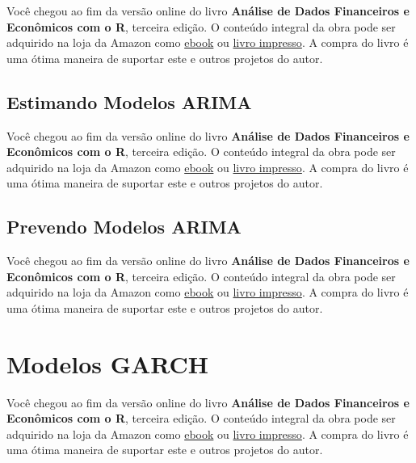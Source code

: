 \documentclass[
  11pt,
]{book}
\newenvironment{pleasebuyit}
{\begin{noteblock}
		
	} {\end{noteblock}}
\begin{document}
\begin{pleasebuyit}
Você chegou ao fim da versão online do livro \textbf{Análise de Dados
Financeiros e Econômicos com o R}, terceira edição. O conteúdo integral
da obra pode ser adquirido na loja da Amazon como
\href{https://www.amazon.com.br/dp/B08WNC27ZY}{ebook} ou
\href{https://www.amazon.com/dp/B08WP8CCDB}{livro impresso}. A compra do
livro é uma ótima maneira de suportar este e outros projetos do autor.
\end{pleasebuyit}

\hypertarget{arima-estimating}{%
\subsection{Estimando Modelos ARIMA}\label{arima-estimating}}

\begin{pleasebuyit}
Você chegou ao fim da versão online do livro \textbf{Análise de Dados
Financeiros e Econômicos com o R}, terceira edição. O conteúdo integral
da obra pode ser adquirido na loja da Amazon como
\href{https://www.amazon.com.br/dp/B08WNC27ZY}{ebook} ou
\href{https://www.amazon.com/dp/B08WP8CCDB}{livro impresso}. A compra do
livro é uma ótima maneira de suportar este e outros projetos do autor.
\end{pleasebuyit}

\hypertarget{prevendo-modelos-arima}{%
\subsection{Prevendo Modelos ARIMA}\label{prevendo-modelos-arima}}

\begin{pleasebuyit}
Você chegou ao fim da versão online do livro \textbf{Análise de Dados
Financeiros e Econômicos com o R}, terceira edição. O conteúdo integral
da obra pode ser adquirido na loja da Amazon como
\href{https://www.amazon.com.br/dp/B08WNC27ZY}{ebook} ou
\href{https://www.amazon.com/dp/B08WP8CCDB}{livro impresso}. A compra do
livro é uma ótima maneira de suportar este e outros projetos do autor.
\end{pleasebuyit}

\hypertarget{modelos-garch}{%
\section{Modelos GARCH}\label{modelos-garch}}

\begin{pleasebuyit}
Você chegou ao fim da versão online do livro \textbf{Análise de Dados
Financeiros e Econômicos com o R}, terceira edição. O conteúdo integral
da obra pode ser adquirido na loja da Amazon como
\href{https://www.amazon.com.br/dp/B08WNC27ZY}{ebook} ou
\href{https://www.amazon.com/dp/B08WP8CCDB}{livro impresso}. A compra do
livro é uma ótima maneira de suportar este e outros projetos do autor.
\end{pleasebuyit}
\end{document}
